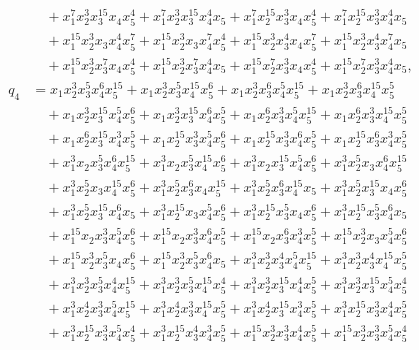 \documentclass[reqno]{amsart}
\theoremstyle{plain}
\theoremstyle{definition}
\theoremstyle{plain}
\theoremstyle{definition}
\numberwithin{equation}{section}
\begin{document}
\begin{align*}
&\quad + x_1^{7}x_2^{3}x_3^{15}x_4x_5^{4} + x_1^{7}x_2^{3}x_3^{15}x_4^{4}x_5 + x_1^{7}x_2^{15}x_3^{3}x_4x_5^{4} + x_1^{7}x_2^{15}x_3^{3}x_4^{4}x_5\\ 
&\quad + x_1^{15}x_2^{3}x_3x_4^{4}x_5^{7} + x_1^{15}x_2^{3}x_3x_4^{7}x_5^{4} + x_1^{15}x_2^{3}x_3^{4}x_4x_5^{7} + x_1^{15}x_2^{3}x_3^{4}x_4^{7}x_5\\ 
&\quad + x_1^{15}x_2^{3}x_3^{7}x_4x_5^{4} + x_1^{15}x_2^{3}x_3^{7}x_4^{4}x_5 + x_1^{15}x_2^{7}x_3^{3}x_4x_5^{4} + x_1^{15}x_2^{7}x_3^{3}x_4^{4}x_5,\\
q_4 &= x_1x_2^{3}x_3^{5}x_4^{6}x_5^{15} + x_1x_2^{3}x_3^{5}x_4^{15}x_5^{6} + x_1x_2^{3}x_3^{6}x_4^{5}x_5^{15} + x_1x_2^{3}x_3^{6}x_4^{15}x_5^{5}\\ 
&\quad + x_1x_2^{3}x_3^{15}x_4^{5}x_5^{6} + x_1x_2^{3}x_3^{15}x_4^{6}x_5^{5} + x_1x_2^{6}x_3^{3}x_4^{5}x_5^{15} + x_1x_2^{6}x_3^{3}x_4^{15}x_5^{5}\\ 
&\quad + x_1x_2^{6}x_3^{15}x_4^{3}x_5^{5} + x_1x_2^{15}x_3^{3}x_4^{5}x_5^{6} + x_1x_2^{15}x_3^{3}x_4^{6}x_5^{5} + x_1x_2^{15}x_3^{6}x_4^{3}x_5^{5}\\ 
&\quad + x_1^{3}x_2x_3^{5}x_4^{6}x_5^{15} + x_1^{3}x_2x_3^{5}x_4^{15}x_5^{6} + x_1^{3}x_2x_3^{15}x_4^{5}x_5^{6} + x_1^{3}x_2^{5}x_3x_4^{6}x_5^{15}\\ 
&\quad + x_1^{3}x_2^{5}x_3x_4^{15}x_5^{6} + x_1^{3}x_2^{5}x_3^{6}x_4x_5^{15} + x_1^{3}x_2^{5}x_3^{6}x_4^{15}x_5 + x_1^{3}x_2^{5}x_3^{15}x_4x_5^{6}\\ 
&\quad + x_1^{3}x_2^{5}x_3^{15}x_4^{6}x_5 + x_1^{3}x_2^{15}x_3x_4^{5}x_5^{6} + x_1^{3}x_2^{15}x_3^{5}x_4x_5^{6} + x_1^{3}x_2^{15}x_3^{5}x_4^{6}x_5\\ 
&\quad + x_1^{15}x_2x_3^{3}x_4^{5}x_5^{6} + x_1^{15}x_2x_3^{3}x_4^{6}x_5^{5} + x_1^{15}x_2x_3^{6}x_4^{3}x_5^{5} + x_1^{15}x_2^{3}x_3x_4^{5}x_5^{6}\\ 
&\quad + x_1^{15}x_2^{3}x_3^{5}x_4x_5^{6} + x_1^{15}x_2^{3}x_3^{5}x_4^{6}x_5 + x_1^{3}x_2^{3}x_3^{4}x_4^{5}x_5^{15} + x_1^{3}x_2^{3}x_3^{4}x_4^{15}x_5^{5}\\ 
&\quad + x_1^{3}x_2^{3}x_3^{5}x_4^{4}x_5^{15} + x_1^{3}x_2^{3}x_3^{5}x_4^{15}x_5^{4} + x_1^{3}x_2^{3}x_3^{15}x_4^{4}x_5^{5} + x_1^{3}x_2^{3}x_3^{15}x_4^{5}x_5^{4}\\ 
&\quad + x_1^{3}x_2^{4}x_3^{3}x_4^{5}x_5^{15} + x_1^{3}x_2^{4}x_3^{3}x_4^{15}x_5^{5} + x_1^{3}x_2^{4}x_3^{15}x_4^{3}x_5^{5} + x_1^{3}x_2^{15}x_3^{3}x_4^{4}x_5^{5}\\ 
&\quad + x_1^{3}x_2^{15}x_3^{3}x_4^{5}x_5^{4} + x_1^{3}x_2^{15}x_3^{4}x_4^{3}x_5^{5} + x_1^{15}x_2^{3}x_3^{3}x_4^{4}x_5^{5} + x_1^{15}x_2^{3}x_3^{3}x_4^{5}x_5^{4}\\ 

\end{align*}
\end{document}
